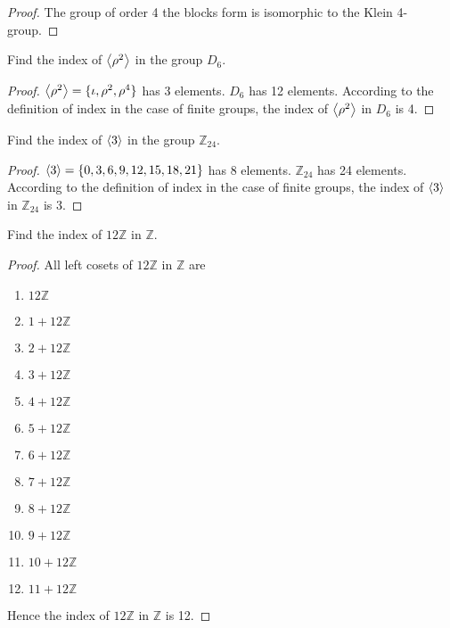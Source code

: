 \begin{proof}
    The group of order 4 the blocks form is isomorphic to the Klein 4-group.
\end{proof}

\begin{exercise}
    Find the index of $\left\langle{\rho^{2}}\right\rangle$ in the group $D_{6}$.
\end{exercise}

\begin{proof}
    $\left\langle{\rho^{2}}\right\rangle = \{ \iota, \rho^{2}, \rho^{4} \}$ has 3 elements. $D_{6}$ has 12 elements. According to the definition of index in the case of finite groups, the index of $\left\langle{\rho^{2}}\right\rangle$ in $D_{6}$ is 4.
\end{proof}

\begin{exercise}
    Find the index of $\left\langle{3}\right\rangle$ in the group $\mathbb{Z}_{24}$.
\end{exercise}

\begin{proof}
    $\left\langle{3}\right\rangle = \{ 0, 3, 6, 9, 12, 15, 18, 21 \}$ has 8 elements. $\mathbb{Z}_{24}$ has 24 elements. According to the definition of index in the case of finite groups, the index of $\left\langle{3}\right\rangle$ in $\mathbb{Z}_{24}$ is 3.
\end{proof}

\begin{exercise}
    Find the index of $12\mathbb{Z}$ in $\mathbb{Z}$.
\end{exercise}

\begin{proof}
    All left cosets of $12\mathbb{Z}$ in $\mathbb{Z}$ are
    \begin{enumerate}[label={(\arabic*)}]
        \item $12\mathbb{Z}$
        \item $1 + 12\mathbb{Z}$
        \item $2 + 12\mathbb{Z}$
        \item $3 + 12\mathbb{Z}$
        \item $4 + 12\mathbb{Z}$
        \item $5 + 12\mathbb{Z}$
        \item $6 + 12\mathbb{Z}$
        \item $7 + 12\mathbb{Z}$
        \item $8 + 12\mathbb{Z}$
        \item $9 + 12\mathbb{Z}$
        \item $10 + 12\mathbb{Z}$
        \item $11 + 12\mathbb{Z}$
    \end{enumerate}

    Hence the index of $12\mathbb{Z}$ in $\mathbb{Z}$ is 12.
\end{proof}

